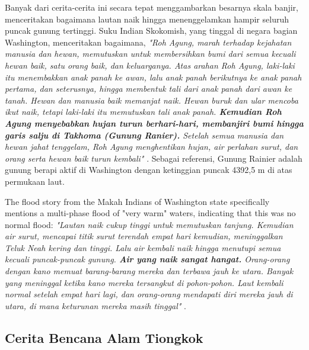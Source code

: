 \documentclass[10pt,twocolumn,letterpaper]{article}
\begin{document}
Banyak dari cerita-cerita ini secara tepat menggambarkan besarnya skala banjir, menceritakan bagaimana lautan naik hingga menenggelamkan hampir seluruh puncak gunung tertinggi. Suku Indian Skokomish, yang tinggal di negara bagian Washington, menceritakan bagaimana, \textit{"Roh Agung, marah terhadap kejahatan manusia dan hewan, memutuskan untuk membersihkan bumi dari semua kecuali hewan baik, satu orang baik, dan keluarganya. Atas arahan Roh Agung, laki-laki itu menembakkan anak panah ke awan, lalu anak panah berikutnya ke anak panah pertama, dan seterusnya, hingga membentuk tali dari anak panah dari awan ke tanah. Hewan dan manusia baik memanjat naik. Hewan buruk dan ular mencoba ikut naik, tetapi laki-laki itu memutuskan tali anak panah. \textbf{Kemudian Roh Agung menyebabkan hujan turun berhari-hari, membanjiri bumi hingga garis salju di Takhoma (Gunung Ranier).} Setelah semua manusia dan hewan jahat tenggelam, Roh Agung menghentikan hujan, air perlahan surut, dan orang serta hewan baik turun kembali"} \cite{3}. Sebagai referensi, Gunung Rainier adalah gunung berapi aktif di Washington dengan ketinggian puncak 4392,5 m di atas permukaan laut.

The flood story from the Makah Indians of Washington state specifically mentions a multi-phase flood of "very warm" waters, indicating that this was no normal flood: \textit{"Lautan naik cukup tinggi untuk memutuskan tanjung. Kemudian air surut, mencapai titik surut terendah empat hari kemudian, meninggalkan Teluk Neah kering dan tinggi. Lalu air kembali naik hingga menutupi semua kecuali puncak-puncak gunung. \textbf{Air yang naik sangat hangat.} Orang-orang dengan kano memuat barang-barang mereka dan terbawa jauh ke utara. Banyak yang meninggal ketika kano mereka tersangkut di pohon-pohon. Laut kembali normal setelah empat hari lagi, dan orang-orang mendapati diri mereka jauh di utara, di mana keturunan mereka masih tinggal"} \cite{3}.

\subsection{Cerita Bencana Alam Tiongkok}
\end{document}
